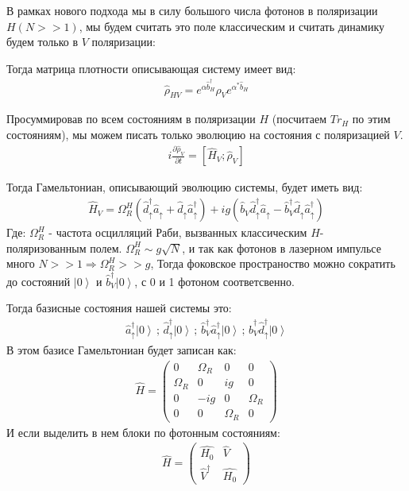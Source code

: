 \documentclass[11pt]{article}    %
\begin{document}
В рамках нового подхода мы в силу большого числа фотонов в поляризации $H \left( N >> 1 \right) $,
мы будем считать это поле классическим и считать динамику будем только в $V$ поляризации:

\par Тогда матрица плотности описывающая систему имеет вид:
\begin{gather}
    \hat{\rho}_{HV} = e^{\alpha \hat{b}^{\dag}_{H}}  \hat{\rho}_{V}  e^{\alpha^{*} \hat{b}_{H}}
\end{gather}

\par Просуммировав по всем состояниям в поляризации $H$ (посчитаем $Tr_{H}$ по этим состояниям),
мы можем писать только эволюцию на состояния с поляризацией $V$.
\begin{gather}
    i \frac{\partial \hat{\rho}_{V} }{\partial t} = \left[ \hat{H}_{V} ; \hat{\rho}_{V} \right]
\end{gather}

\par Тогда Гамельтониан, описывающий эволюцию системы, будет иметь вид:
\begin{gather}
    \hat{H}_V = \Omega_R^{H} \left( \hat{d}^{\dag}_{\uparrow} \hat{a}_{\uparrow}
    + \hat{d}_{\uparrow} \hat{a}^{\dag}_{\uparrow} \right)
    + ig \left( \hat{b}_{V} \hat{d}^{\dag}_{\uparrow} \hat{a}_{\uparrow}
    - \hat{b}^{\dag}_{V} \hat{d}_{\uparrow} \hat{a}^{\dag}_{\uparrow} \right)
\end{gather}
Где: $\Omega_R^{H} $ - частота осцилляций Раби, вызванных классическим $H$- поляризованным полем.
$\Omega_R^{H} \sim g \sqrt{N} $, и так как фотонов в лазерном импульсе много $N >> 1 \Rightarrow \Omega_R^{H} >>  g $,
Тогда фоковское пространоство можно сократить до состояний $ \left| 0 \right> $ и $ \hat{b}^{\dag}_{V} \left| 0 \right> $,
с 0 и 1 фотоном соответсвенно.

\par Тогда базисные состояния нашей системы это:
\begin{gather}
    \hat{a}^{\dag}_{\uparrow} \left| 0 \right> \, ; \, \hat{d}^{\dag}_{\uparrow} \left| 0 \right> \, ; \, \hat{b}^{\dag}_{V} \hat{a}^{\dag}_{\uparrow} \left| 0 \right> \, ; \, \hat{b}^{\dag}_{V} \hat{d}^{\dag}_{\uparrow} \left| 0 \right>
\end{gather}
В этом базисе Гамельтониан будет записан как:
\begin{gather}
    \hat{H} =
\begin{pmatrix}
    0 & \Omega_R & 0 & 0 \\
    \Omega_R & 0 & ig & 0 \\
    0 & -ig & 0 & \Omega_R \\
    0 & 0 & \Omega_R & 0
\end{pmatrix}
\end{gather}
И если выделить в нем блоки по фотонным состояниям:
\begin{gather}
    \hat{H} =
\begin{pmatrix}
    \hat{H_0} & \hat{V} \\
    \hat{V}^{\dag} & \hat{H_0}
\end{pmatrix}
\end{gather}
\end{document}
